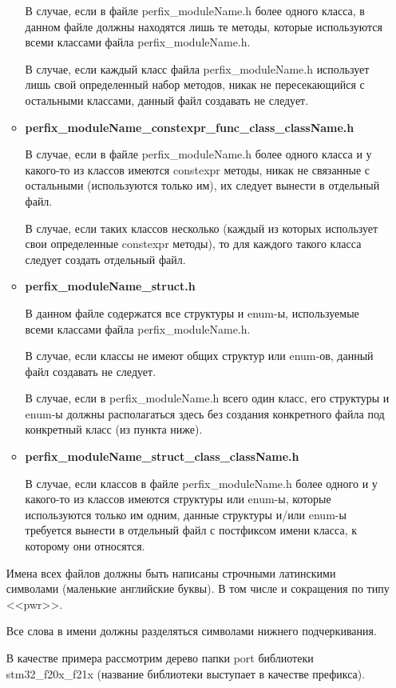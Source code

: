 \begin{enumerate}
\begin{itemize}
		В случае, если в файле perfix\_moduleName.h более одного класса, в данном файле должны находятся лишь те методы, которые используются всеми классами файла perfix\_moduleName.h.
		
		В случае, если каждый класс файла perfix\_moduleName.h использует лишь свой определенный набор методов, никак не пересекающийся с остальными классами, данный файл создавать не следует.
		\item \textbf{perfix\_moduleName\_constexpr\_func\_class\_className.h}
		
		В случае, если в файле perfix\_moduleName.h более одного класса и у какого-то из классов имеются constexpr методы, никак не связанные с остальными (используются только им), их следует вынести в отдельный файл. 
		
		В случае, если таких классов несколько (каждый из которых использует свои определенные constexpr методы), то для каждого такого класса следует создать отдельный файл.
		\item \textbf{perfix\_moduleName\_struct.h}
		
		В данном файле содержатся все структуры и enum-ы, используемые всеми классами файла perfix\_moduleName.h.
		
		В случае, если классы не имеют общих структур или enum-ов, данный файл создавать не следует.
		
		В случае, если в perfix\_moduleName.h всего один класс, его структуры и enum-ы должны располагаться здесь без создания конкретного файла под конкретный класс (из пункта ниже).
		\item \textbf{perfix\_moduleName\_struct\_class\_className.h}
		
		В случае, если классов в файле perfix\_moduleName.h более одного и у какого-то из классов имеются структуры или enum-ы, которые используются только им одним, данные структуры и/или enum-ы требуется вынести в отдельный файл с постфиксом имени класса, к которому они относятся.
	\end{itemize}

	Имена всех файлов должны быть написаны строчными латинскими символами (маленькие английские буквы). В том числе и сокращения по типу <<pwr>>.
	
	Все слова в имени должны разделяться символами нижнего подчеркивания. 
	
	В качестве примера рассмотрим дерево папки port библиотеки stm32\_f20x\_f21x (название библиотеки выступает в качестве префикса).
	

\end{enumerate}
